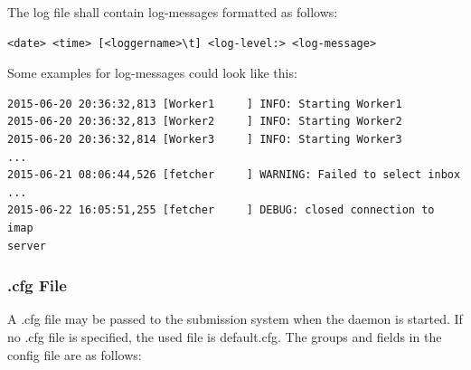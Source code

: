 The log file shall contain log-messages formatted as follows:

\begin{verbatim}
<date> <time> [<loggername>\t] <log-level:> <log-message>
\end{verbatim}

Some examples for log-messages could look like this:

\begin{verbatim}
2015-06-20 20:36:32,813 [Worker1     ] INFO: Starting Worker1
2015-06-20 20:36:32,813 [Worker2     ] INFO: Starting Worker2
2015-06-20 20:36:32,814 [Worker3     ] INFO: Starting Worker3
...
2015-06-21 08:06:44,526 [fetcher     ] WARNING: Failed to select inbox
...
2015-06-22 16:05:51,255 [fetcher     ] DEBUG: closed connection to imap
server
\end{verbatim}

\subsubsection{.cfg File}
A .cfg file may be passed to the submission system when the daemon is started. If no .cfg file
is specified, the used file is default.cfg. The groups and fields in the config file are as follows:

